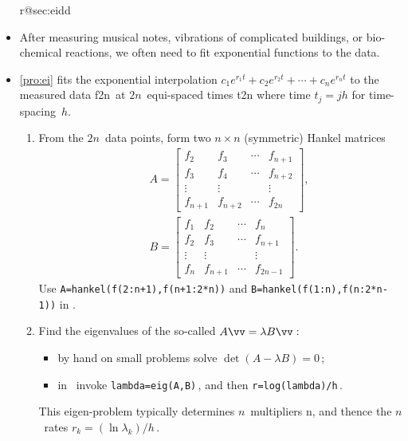 \begin{itemize}
\ifcsname r@sec:eidd\endcsname%
\item After measuring musical notes, vibrations of complicated buildings, or bio-chemical reactions, we often need to fit exponential functions to the data.

\item \cref{pro:ei} fits the exponential interpolation \(c_1e^{r_1t}+c_2e^{r_2t}+\cdots+c_ne^{r_nt}\) to the measured data \hlist f{2n}\ at \(2n\)~equi-spaced times \hlist t{2n} where time \(t_j=jh\) for time-spacing~\(h\).
\begin{enumerate}
\item From the \(2n\)~data points, form two \(n\times n\) (symmetric) Hankel matrices 
\begin{eqnarray*}&&
A=\begin{bmatrix} f_2&f_3&\cdots&f_{n+1}
\\f_3&f_4&\cdots&f_{n+2}
\\\vdots&\vdots&&\vdots
\\f_{n+1}&f_{n+2}&\cdots&f_{2n} \end{bmatrix},
\\&&
B=\begin{bmatrix} f_1&f_2&\cdots&f_{n}
\\f_2&f_3&\cdots&f_{n+1}
\\\vdots&\vdots&&\vdots
\\f_{n}&f_{n+1}&\cdots&f_{2n-1} \end{bmatrix}.
\end{eqnarray*}
Use \verb|A=hankel(f(2:n+1),f(n+1:2*n))| and \verb|B=hankel(f(1:n),f(n:2*n-1))| in \script.

\item Find the eigenvalues of the so-called  \(A\vv=\lambda B\vv\)\,: 
\begin{itemize}
\item by hand on small problems solve \(\det(A-\lambda B)=0\)\,;
\item in \script\ invoke \verb|lambda=eig(A,B)|\,, and then \verb|r=log(lambda)/h|\,.
\end{itemize}
This eigen-problem typically determines \(n\)~multipliers \hlist\lambda n, and thence the \(n\)~rates \(r_k=(\ln\lambda_k)/h\)\,.


\end{enumerate}
\end{itemize}
